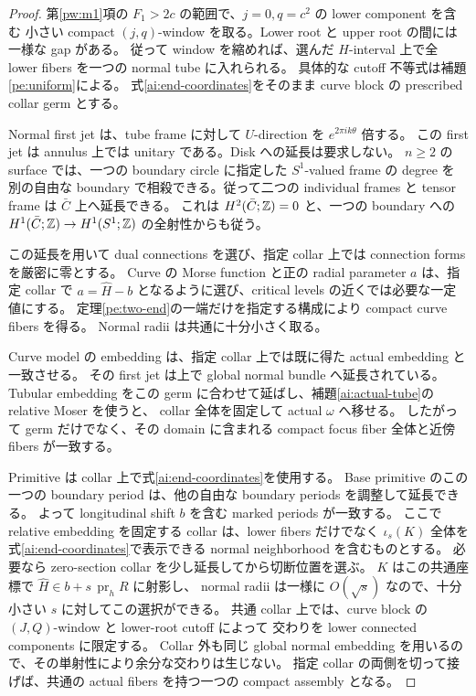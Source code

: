 \begin{proof}
第\ref{pw:m1}項の $F_1>2c$ の範囲で、$j=0,q=c^2$ の lower component を含む
小さい compact $(j,q)$-window を取る。Lower root と upper root の間には一様な gap がある。
従って window を縮めれば、選んだ $H$-interval 上で全 lower fibers を一つの normal tube に入れられる。
具体的な cutoff 不等式は補題\ref{pe:uniform}による。
式\eqref{ai:end-coordinates}をそのまま curve block の prescribed collar germ とする。

Normal first jet は、tube frame に対して $U$-direction を $e^{2\pi ik\theta}$ 倍する。
この first jet は annulus 上では unitary である。Disk への延長は要求しない。
$n\ge2$ の surface では、一つの boundary circle に指定した $S^1$-valued frame の degree を
別の自由な boundary で相殺できる。従って二つの individual frames と tensor frame は
$\bar C$ 上へ延長できる。
これは $H^2(\bar C;\mathbb Z)=0$ と、一つの boundary への
$H^1(\bar C;\mathbb Z)\to H^1(S^1;\mathbb Z)$ の全射性からも従う。

この延長を用いて dual connections を選び、指定 collar 上では connection forms を厳密に零とする。
Curve の Morse function と正の radial parameter $a$ は、指定 collar で
$a=\widehat H-b$ となるように選び、critical levels の近くでは必要な一定値にする。
定理\ref{pe:two-end}の一端だけを指定する構成により compact curve fibers を得る。
Normal radii は共通に十分小さく取る。

Curve model の embedding は、指定 collar 上では既に得た actual embedding と一致させる。
その first jet は上で global normal bundle へ延長されている。
Tubular embedding をこの germ に合わせて延ばし、補題\ref{ai:actual-tube}の relative Moser を使うと、
collar 全体を固定して actual $\omega$ へ移せる。
したがって germ だけでなく、その domain に含まれる compact focus fiber 全体と近傍 fibers が一致する。

Primitive は collar 上で式\eqref{ai:end-coordinates}を使用する。
Base primitive のこの一つの boundary period は、他の自由な boundary periods を調整して延長できる。
よって longitudinal shift $b$ を含む marked periods が一致する。
ここで relative embedding を固定する collar は、lower fibers だけでなく
$\iota_s(K)$ 全体を式\eqref{ai:end-coordinates}で表示できる normal neighborhood を含むものとする。
必要なら zero-section collar を少し延長してから切断位置を選ぶ。
$K$ はこの共通座標で $\widehat H\in b+s\,\operatorname{pr}_h R$ に射影し、
normal radii は一様に $O(\sqrt s)$ なので、十分小さい $s$ に対してこの選択ができる。
共通 collar 上では、curve block の $(J,Q)$-window と lower-root cutoff によって
交わりを lower connected components に限定する。
Collar 外も同じ global normal embedding を用いるので、その単射性により余分な交わりは生じない。
指定 collar の両側を切って接げば、共通の actual fibers を持つ一つの compact assembly となる。
\end{proof}

